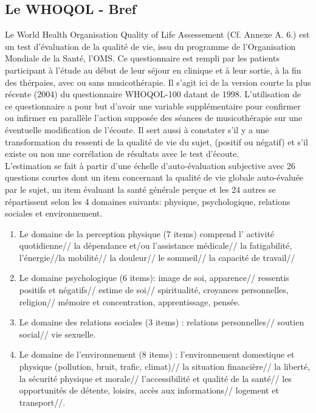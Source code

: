 \subsection {Le WHOQOL  - Bref}  
Le World Health 	Organisation Quality of Life Assessement  (Cf. Annexe A. 6.) 
est un test d'évaluation de la qualité de vie, issu du
programme de l'Organisation Mondiale de la Santé, l'OMS.
Ce questionnaire est rempli par
les patients participant à l'étude au début de leur séjour en clinique et
à leur sortie, à la fin des thérpaies, avec ou sans musicothérapie.
Il s'agit ici de la version courte  la plus récente (2004) du questionnaire
WHOQOL-100 datant de 1998.
L'utilisation de ce questionnaire a pour but d'avoir
une variable supplémentaire pour confirmer ou infirmer en
parallèle l'action supposée des séances de musicothérapie sur une éventuelle
modification de l'écoute.
Il sert aussi à constater s'il y a une transformation du ressenti de la qualité de vie  du sujet,
(positif ou négatif) et s'il existe ou non une corrélation de
résultats avec le test d'écoute.
 \\
L'estimation se fait à partir d'une échelle
d'auto-évaluation subjective avec 26 questions courtes
dont un item concernant la qualité de vie globale
auto-évaluée par le sujet, un item évaluant la santé générale perçue
et les 24 autres se répartissent selon les 4 domaines suivants: physique, psychologique, relations 
sociales et environnement.
\begin{enumerate}
	\item  Le domaine de la perception physique (7 items) comprend l' activité quotidienne// la dépendance 
	et/ou l'assistance médicale// la fatigabilité, l'énergie//la mobilité// la douleur// le sommeil// la capacité 
	de travail//
	\item Le domaine psychologique (6 items):  image de soi, apparence// ressentis positifs et négatifs// 
	estime de soi// spiritualité, croyances personnelles, religion// mémoire et concentration, apprentissage, 
	pensée.
	\item Le domaine des relations sociales (3 items) : relations personnelles// soutien social// vie sexuelle.
	\item Le domaine de l'environnement (8 items) :
	l'environnement domestique et physique
	(pollution, bruit, trafic, climat)// la
	situation financière//  la liberté, la
	sécurité physique et morale//
	l'accessibilité et qualité de la santé// les
	opportunités de détente, loisirs, accès aux
	informations// logement et transport//.
\end{enumerate}
